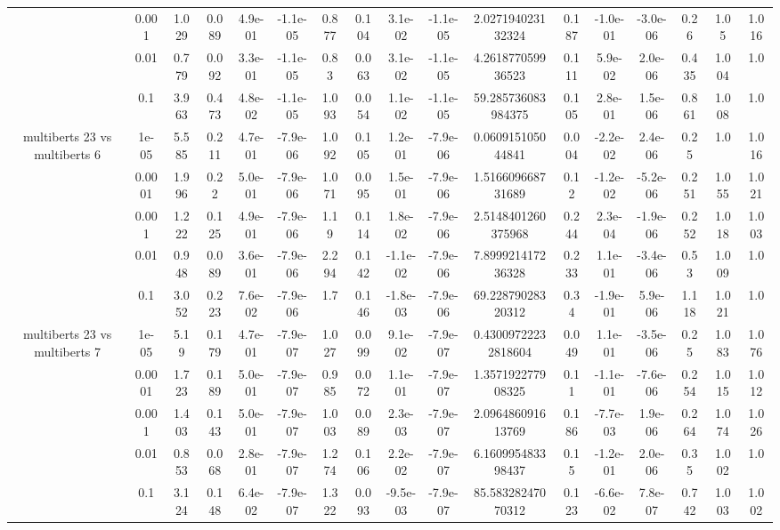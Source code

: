 \begin{tabular}{|c|c|c|c|c|c|c|c|c|c|c|c|c|c|c|c|c|}
 & 0.001 & 1.029 & 0.089 & 4.9e-01 & -1.1e-05 & 0.877 & 0.104 & 3.1e-02 & -1.1e-05 & 2.027194023132324 & 0.187 & -1.0e-01 & -3.0e-06 & 0.26 & 1.05 & 1.016 \\
 & 0.01 & 0.779 & 0.092 & 3.3e-01 & -1.1e-05 & 0.83 & 0.063 & 3.1e-02 & -1.1e-05 & 4.261877059936523 & 0.111 & 5.9e-02 & 2.0e-06 & 0.435 & 1.004 & 1.0 \\
 & 0.1 & 3.963 & 0.473 & 4.8e-02 & -1.1e-05 & 1.093 & 0.054 & 1.1e-02 & -1.1e-05 & 59.285736083984375 & 0.105 & 2.8e-01 & 1.5e-06 & 0.861 & 1.008 & 1.0 \\
\hline
\multirow{5}{*}{multiberts 23 vs multiberts 6} & 1e-05 & 5.585 & 0.211 & 4.7e-01 & -7.9e-06 & 1.092 & 0.105 & 1.2e-01 & -7.9e-06 & 0.060915105044841 & 0.004 & -2.2e-02 & 2.4e-06 & 0.25 & 1.0 & 1.016 \\
 & 0.0001 & 1.996 & 0.22 & 5.0e-01 & -7.9e-06 & 1.071 & 0.095 & 1.5e-01 & -7.9e-06 & 1.516609668731689 & 0.12 & -1.2e-02 & -5.2e-06 & 0.251 & 1.055 & 1.021 \\
 & 0.001 & 1.222 & 0.125 & 4.9e-01 & -7.9e-06 & 1.19 & 0.114 & 1.8e-02 & -7.9e-06 & 2.5148401260375968 & 0.244 & 2.3e-04 & -1.9e-06 & 0.252 & 1.018 & 1.003 \\
 & 0.01 & 0.948 & 0.089 & 3.6e-01 & -7.9e-06 & 2.294 & 0.142 & -1.1e-02 & -7.9e-06 & 7.899921417236328 & 0.233 & 1.1e-01 & -3.4e-06 & 0.53 & 1.009 & 1.0 \\
 & 0.1 & 3.052 & 0.223 & 7.6e-02 & -7.9e-06 & 1.7 & 0.146 & -1.8e-03 & -7.9e-06 & 69.22879028320312 & 0.34 & -1.9e-01 & 5.9e-06 & 1.118 & 1.021 & 1.0 \\
\hline
\multirow{5}{*}{multiberts 23 vs multiberts 7} & 1e-05 & 5.19 & 0.179 & 4.7e-01 & -7.9e-07 & 1.027 & 0.099 & 9.1e-02 & -7.9e-07 & 0.43009722232818604 & 0.049 & 1.1e-01 & -3.5e-06 & 0.25 & 1.083 & 1.076 \\
 & 0.0001 & 1.723 & 0.189 & 5.0e-01 & -7.9e-07 & 0.985 & 0.072 & 1.1e-01 & -7.9e-07 & 1.357192277908325 & 0.11 & -1.1e-01 & -7.6e-06 & 0.254 & 1.015 & 1.012 \\
 & 0.001 & 1.403 & 0.143 & 5.0e-01 & -7.9e-07 & 1.003 & 0.089 & 2.3e-03 & -7.9e-07 & 2.096486091613769 & 0.186 & -7.7e-03 & 1.9e-06 & 0.264 & 1.074 & 1.026 \\
 & 0.01 & 0.853 & 0.068 & 2.8e-01 & -7.9e-07 & 1.274 & 0.106 & 2.2e-02 & -7.9e-07 & 6.160995483398437 & 0.15 & -1.2e-01 & 2.0e-06 & 0.35 & 1.002 & 1.0 \\
 & 0.1 & 3.124 & 0.148 & 6.4e-02 & -7.9e-07 & 1.322 & 0.093 & -9.5e-03 & -7.9e-07 & 85.58328247070312 & 0.123 & -6.6e-02 & 7.8e-07 & 0.742 & 1.003 & 1.002 \\

\end{tabular}
